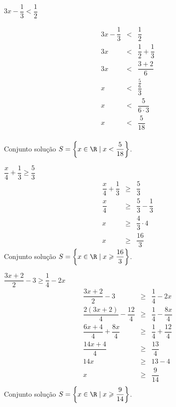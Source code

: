  \begin{exem} 
 $3x - \dfrac{1}{3} < \dfrac{1}{2}$
 
 \begin{eqnarray*}
  3x - \dfrac{1}{3} &<& \dfrac{1}{2} \\
  3x  &<& \dfrac{1}{2} + \dfrac{1}{3} \\
  3x  &<& \dfrac{3 + 2}{6} \\
  x  &<& \dfrac{\frac{5}{6}}{3} \\
  x  &<& \dfrac{5}{6 \cdot 3} \\
  x  &<& \dfrac{5}{18} \\
  \end{eqnarray*}
  
  Conjunto solução $S= \left\{x \in \R \mid x < \dfrac{5}{18} \right\}$.
 \end{exem}
 
  \begin{exem} 
 $\dfrac{x}{4} + \dfrac{1}{3} \geqslant \dfrac{5}{3}$
 \begin{eqnarray*}
  \dfrac{x}{4} + \dfrac{1}{3} & \geqslant & \dfrac{5}{3} \\
  \dfrac{x}{4} & \geqslant & \dfrac{5}{3} - \dfrac{1}{3} \\
  x & \geqslant & \dfrac{4}{3} \cdot 4 \\
  x & \geqslant & \dfrac{16}{3}
  \end{eqnarray*}
  Conjunto solução $S= \left\{x \in \R \mid x \geqslant \dfrac{16}{3} \right\}$.
 \end{exem}
 
 \begin{exem}
 $\dfrac{3x+2}{2} - 3 \geqslant \dfrac{1}{4} - 2x$ 
 \begin{eqnarray*}
  \dfrac{3x+2}{2} - 3 &\geqslant & \dfrac{1}{4} - 2x \\
  \dfrac{2(3x+2)}{4} - \dfrac{12}{4} &\geqslant & \dfrac{1}{4} - \dfrac{8x}{4} \\
  \dfrac{6x+4}{4} + \dfrac{8x}{4} &\geqslant & \dfrac{1}{4} + \dfrac{12}{4} \\
  \dfrac{14x+4}{4}  &\geqslant & \dfrac{13}{4} \\
  14x  &\geqslant & 13 - 4\\
  x  &\geqslant & \dfrac{9}{14}\\
  \end{eqnarray*}
  Conjunto solução $S= \left\{x \in \R \mid x \geqslant \dfrac{9}{14} \right\}$.
 \end{exem}
 
